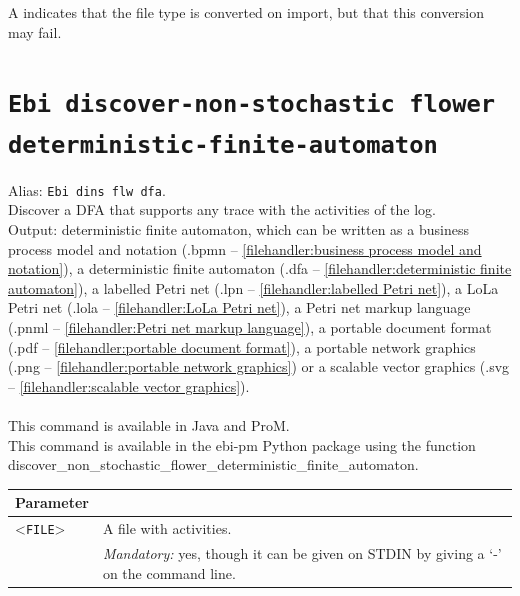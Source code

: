 {\begin{tabularx}{\linewidth}{lX}
\bottomrule
\end{tabularx}
A \textdagger{} indicates that the file type is converted on import, but that this conversion may fail.
\clearpage\section{\texttt{Ebi discover-non-stochastic flower deterministic-finite-automaton}}
\label{command:Ebi discover-non-stochastic flower deterministic-finite-automaton}
Alias: \texttt{Ebi dins flw dfa}.\\
Discover a DFA that supports any trace with the activities of the log.\\
\noindent Output: deterministic finite automaton, which can be written as a business process model and notation (.bpmn -- \cref{filehandler:business process model and notation}), a deterministic finite automaton (.dfa -- \cref{filehandler:deterministic finite automaton}), a labelled Petri net (.lpn -- \cref{filehandler:labelled Petri net}), a LoLa Petri net (.lola -- \cref{filehandler:LoLa Petri net}), a Petri net markup language (.pnml -- \cref{filehandler:Petri net markup language}), a portable document format (.pdf -- \cref{filehandler:portable document format}), a portable network graphics (.png -- \cref{filehandler:portable network graphics}) or a scalable vector graphics (.svg -- \cref{filehandler:scalable vector graphics}).\\
\\This command is available in Java and ProM.
\\This command is available in the ebi-pm Python package using the function discover\_non\_stochastic\_flower\_deterministic\_finite\_automaton.
\begin{tabularx}{\linewidth}{lX}
\toprule
Parameter \\\midrule
<\texttt{FILE}>&A file with activities.\\
&\textit{Mandatory:} \quad yes, though it can be given on STDIN by giving a `-' on the command line.\\

\end{tabularx}}
